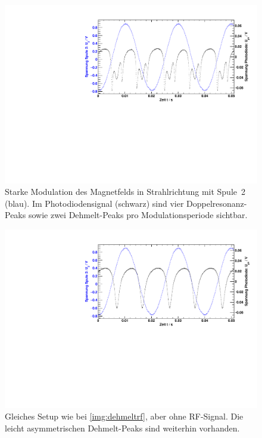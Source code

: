 \begin{figure}[H]
\begin{center}
  \includegraphics[width=\textwidth]{../img/part3/06.pdf}
  \caption{Starke Modulation des Magnetfelds in Strahlrichtung mit Spule~2 (blau).
   Im Photodiodensignal (schwarz) sind vier Doppelresonanz-Peaks sowie
   zwei Dehmelt-Peaks pro Modulationsperiode sichtbar.}
  \label{img:dehmeltrf}
\end{center}
\end{figure}

\begin{figure}[H]
\begin{center}
    \includegraphics[width=\textwidth]{../img/part3/07.pdf}
    \caption{Gleiches Setup wie bei \autoref{img:dehmeltrf}, aber ohne RF-Signal.
    Die leicht asymmetrischen Dehmelt-Peaks sind weiterhin vorhanden.}
    \label{img:dehmelt}
\end{center}
\end{figure}

